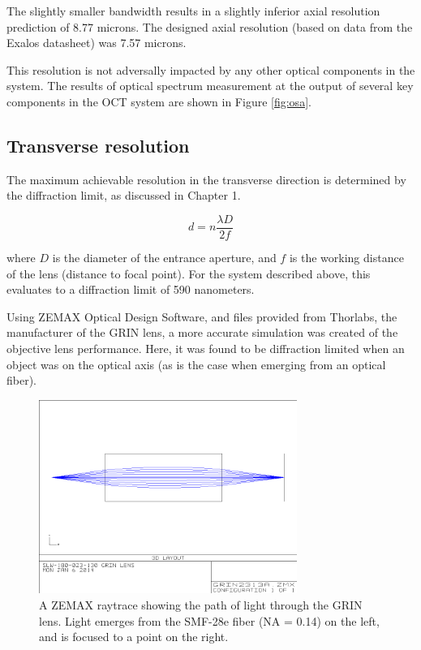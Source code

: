 The slightly smaller bandwidth results in a slightly inferior axial resolution prediction of 8.77 microns. The designed axial resolution (based on data from the Exalos datasheet) was 7.57 microns.

This resolution is not adversally impacted by any other optical components in the system. The results of optical spectrum measurement at the output of several key components in the OCT system are shown in Figure \ref{fig:osa}.


\subsection{Transverse resolution}
\label{sec:transverse_res}

The maximum achievable resolution in the transverse direction is determined by the diffraction limit, as discussed in Chapter 1.

\begin{equation} \label{eq:tres2}
d = n\frac{\lambda D}{2f}
\end{equation}

where $D$ is the diameter of the entrance aperture, and $f$ is the working distance of the lens (distance to focal point). For the system described above, this evaluates to a diffraction limit of 590 nanometers.

Using ZEMAX Optical Design Software, and files provided from Thorlabs, the manufacturer of the GRIN lens, a more accurate simulation was created of the objective lens performance. Here, it was found to be diffraction limited when an object was on the optical axis (as is the case when emerging from an optical fiber).

\begin{figure}[h!]
\centering
\includegraphics[width=0.75\textwidth]{Images/Zemax/GRO-raytrace.png}
\caption{A ZEMAX raytrace showing the path of light through the GRIN lens. Light emerges from the SMF-28e fiber (NA = 0.14) on the left, and is focused to a point on the right.}
\end{figure}

